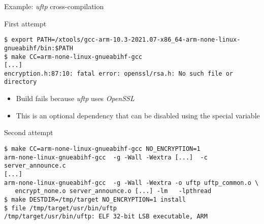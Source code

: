 \begin{frame}[fragile]{Example: {\em uftp} cross-compilation}
  \begin{block}{First attempt}
    {\tiny
\begin{verbatim}
$ export PATH=/xtools/gcc-arm-10.3-2021.07-x86_64-arm-none-linux-gnueabihf/bin:$PATH
$ make CC=arm-none-linux-gnueabihf-gcc
[...]
encryption.h:87:10: fatal error: openssl/rsa.h: No such file or directory
\end{verbatim}
    }
  \end{block}

  \begin{itemize}
  \item Build fails because {\em uftp} uses {\em OpenSSL}
  \item This is an optional dependency that can be disabled using the
    special  variable 
  \end{itemize}

  \begin{block}{Second attempt}
    {\tiny
\begin{verbatim}
$ make CC=arm-none-linux-gnueabihf-gcc NO_ENCRYPTION=1
arm-none-linux-gnueabihf-gcc  -g -Wall -Wextra [...]  -c server_announce.c
[...]
arm-none-linux-gnueabihf-gcc  -g -Wall -Wextra -o uftp uftp_common.o \
   encrypt_none.o server_announce.o [...] -lm   -lpthread
$ make DESTDIR=/tmp/target NO_ENCRYPTION=1 install
$ file /tmp/target/usr/bin/uftp
/tmp/target/usr/bin/uftp: ELF 32-bit LSB executable, ARM
\end{verbatim}
    }
  \end{block}
\end{frame}

